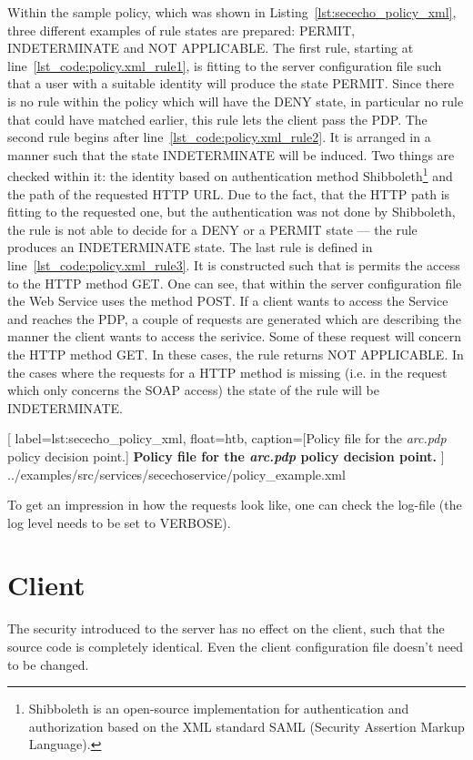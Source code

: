 Within the sample policy, which was shown in Listing~\ref{lst:sececho_policy_xml}, three different examples of rule states are prepared: PERMIT, INDETERMINATE and NOT APPLICABLE.
The first rule, starting at line~\ref{lst_code:policy.xml_rule1}, is fitting to the server configuration file such that a user with a suitable identity will produce the state PERMIT. 
Since there is no rule within the policy which will have the DENY state, in particular no rule that could have matched earlier, this rule lets the client pass the PDP.
The second rule begins after line~\ref{lst_code:policy.xml_rule2}. It is arranged in a manner such that the state INDETERMINATE will be induced. Two things are checked within it: the identity based on authentication method Shibboleth\footnote{Shibboleth is an open-source implementation for authentication and authorization based on the XML standard SAML (Security Assertion Markup Language).} 
and the path of the requested HTTP URL. Due to the fact, that the HTTP path is fitting to the requested one, but the authentication was not done by Shibboleth, the rule is not able to decide for a DENY or a PERMIT state --- the rule produces an INDETERMINATE state.
The last rule is defined in line~\ref{lst_code:policy.xml_rule3}. It is constructed such that is permits the access to the HTTP method GET. 
One can see, that within the server configuration file the Web Service uses the method POST. If a client wants to access the Service and reaches the PDP, a couple of requests are generated which are describing the manner the client wants to access the serivice. Some of these request will concern the HTTP method GET. In these cases, the rule returns NOT APPLICABLE. In the cases where the requests for a HTTP method is missing (i.e. in the request which only concerns the SOAP access) the state of the rule will be INDETERMINATE.\\

	[
	label=lst:sececho_policy_xml, float=htb,
	caption={[Policy file for the \textit{arc.pdp} policy decision point.]
	\textbf{Policy file for the \textit{arc.pdp} policy decision point.}}
	]
{../examples/src/services/secechoservice/policy_example.xml}


To get an impression in how the requests look like, one can check the log-file (the log level needs to be set to VERBOSE).


\section{Client}

The security introduced to the server has no effect on the client, such that the source code is completely identical. Even the client configuration file doesn't need to be changed.
















